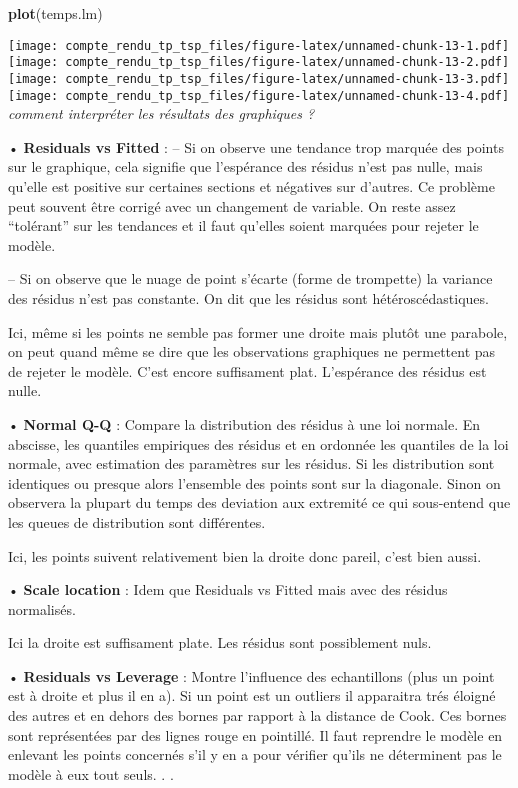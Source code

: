 \documentclass[
]{article}
\newenvironment{Shaded}{\begin{snugshade}}{\end{snugshade}}
\newcommand{\KeywordTok}[1]{\textcolor[rgb]{0.13,0.29,0.53}{\textbf{#1}}}
\newcommand{\NormalTok}[1]{#1}
\begin{document}
\begin{Shaded}
\begin{Highlighting}[]
\KeywordTok{plot}\NormalTok{(temps.lm)}
\end{Highlighting}
\end{Shaded}

\texttt{[image: compte\_rendu\_tp\_tsp\_files/figure-latex/unnamed-chunk-13-1.pdf]}
\texttt{[image: compte\_rendu\_tp\_tsp\_files/figure-latex/unnamed-chunk-13-2.pdf]}
\texttt{[image: compte\_rendu\_tp\_tsp\_files/figure-latex/unnamed-chunk-13-3.pdf]}
\texttt{[image: compte\_rendu\_tp\_tsp\_files/figure-latex/unnamed-chunk-13-4.pdf]}
\emph{comment interpréter les résultats des graphiques ?}

• \textbf{Residuals vs Fitted} : -- Si on observe une tendance trop
marquée des points sur le graphique, cela signifie que l'espérance des
résidus n'est pas nulle, mais qu'elle est positive sur certaines
sections et négatives sur d'autres. Ce problème peut souvent être
corrigé avec un changement de variable. On reste assez ``tolérant'' sur
les tendances et il faut qu'elles soient marquées pour rejeter le
modèle.

-- Si on observe que le nuage de point s'écarte (forme de trompette) la
variance des résidus n'est pas constante. On dit que les résidus sont
hétéroscédastiques.

Ici, même si les points ne semble pas former une droite mais plutôt une
parabole, on peut quand même se dire que les observations graphiques ne
permettent pas de rejeter le modèle. C'est encore suffisament plat.
L'espérance des résidus est nulle.

• \textbf{Normal Q-Q} : Compare la distribution des résidus à une loi
normale. En abscisse, les quantiles empiriques des résidus et en
ordonnée les quantiles de la loi normale, avec estimation des paramètres
sur les résidus. Si les distribution sont identiques ou presque alors
l'ensemble des points sont sur la diagonale. Sinon on observera la
plupart du temps des deviation aux extremité ce qui sous-entend que les
queues de distribution sont différentes.

Ici, les points suivent relativement bien la droite donc pareil, c'est
bien aussi.

• \textbf{Scale location} : Idem que Residuals vs Fitted mais avec des
résidus normalisés.

Ici la droite est suffisament plate. Les résidus sont possiblement nuls.

• \textbf{Residuals vs Leverage} : Montre l'influence des echantillons
(plus un point est à droite et plus il en a). Si un point est un
outliers il apparaitra trés éloigné des autres et en dehors des bornes
par rapport à la distance de Cook. Ces bornes sont représentées par des
lignes rouge en pointillé. Il faut reprendre le modèle en enlevant les
points concernés s'il y en a pour vérifier qu'ils ne déterminent pas le
modèle à eux tout seuls. . .
\end{document}
